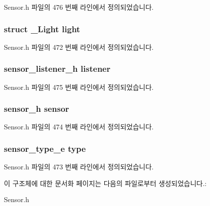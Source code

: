 Sensor.\-h 파일의 476 번째 라인에서 정의되었습니다.

\hypertarget{struct__LightExtend_ac99fe442698fe6dee34b12dae4f856b3}{
\subsubsection[{light}]{\setlength{\rightskip}{0pt plus 5cm}struct {\bf \-\_\-\-Light} light}}\label{struct__LightExtend_ac99fe442698fe6dee34b12dae4f856b3}


Sensor.\-h 파일의 472 번째 라인에서 정의되었습니다.

\hypertarget{struct__LightExtend_aa977dfb866b24fd7d9a20a9a01b2fd1f}{
\subsubsection[{listener}]{\setlength{\rightskip}{0pt plus 5cm}sensor\-\_\-listener\-\_\-h listener}}\label{struct__LightExtend_aa977dfb866b24fd7d9a20a9a01b2fd1f}


Sensor.\-h 파일의 475 번째 라인에서 정의되었습니다.

\hypertarget{struct__LightExtend_a5bae9b7801bc3808411925cde81d3f26}{
\subsubsection[{sensor}]{\setlength{\rightskip}{0pt plus 5cm}sensor\-\_\-h sensor}}\label{struct__LightExtend_a5bae9b7801bc3808411925cde81d3f26}


Sensor.\-h 파일의 474 번째 라인에서 정의되었습니다.

\hypertarget{struct__LightExtend_abffb09766da2fc510a79bb51f82a36e1}{
\subsubsection[{type}]{\setlength{\rightskip}{0pt plus 5cm}sensor\-\_\-type\-\_\-e type}}\label{struct__LightExtend_abffb09766da2fc510a79bb51f82a36e1}


Sensor.\-h 파일의 473 번째 라인에서 정의되었습니다.



이 구조체에 대한 문서화 페이지는 다음의 파일로부터 생성되었습니다.\-:\begin{DoxyCompactItemize}
\item 
Sensor.\-h\end{DoxyCompactItemize}
